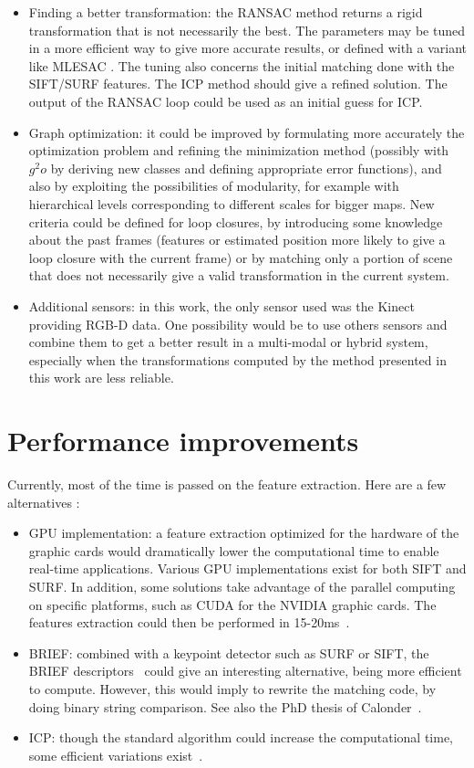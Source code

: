 \begin{itemize}
\item Finding a better transformation: the \gls{RANSAC} method returns a rigid transformation that is not necessarily the best. The parameters may be tuned in a more efficient way to give more accurate results, or defined with a variant like MLESAC \cite{TorrZ00}. The tuning also concerns the initial matching done with the \gls{SIFT}/\gls{SURF} features. The \gls{ICP} \cite{zhang_92_icp} method should give a refined solution. The output of the \gls{RANSAC} loop could be used as an initial guess for \gls{ICP}. 
\item Graph optimization: it could be improved by formulating more accurately the optimization problem and refining the minimization method (possibly with~$g^2o$ by deriving new classes and defining appropriate error functions), and also by exploiting the possibilities of modularity, for example with hierarchical levels corresponding to different scales for bigger maps. New criteria could be defined for loop closures, by introducing some knowledge about the past frames (features or estimated position more likely to give a loop closure with the current frame) or by matching only a portion of scene that does not necessarily give a valid transformation in the current system.
\item Additional sensors: in this work, the only sensor used was the Kinect providing RGB-D data. One possibility would be to use others sensors and combine them to get a better result in a multi-modal or hybrid system, especially when the transformations computed by the method presented in this work are less reliable.
\end{itemize}

\section{Performance improvements}

Currently, most of the time is passed on the feature extraction. Here are a few alternatives :
\begin{itemize}
\item GPU implementation: a feature extraction optimized for the hardware of the graphic cards would dramatically lower the computational time to enable real-time applications. Various GPU implementations exist for both SIFT and SURF. In addition, some solutions take advantage of the parallel computing on specific platforms, such as CUDA\texttrademark{} for the NVIDIA graphic cards. The features extraction could then be performed in 15-20ms~\cite{bjorkman}.
\item BRIEF: combined with a keypoint detector such as \gls{SURF} or \gls{SIFT}, the \gls{BRIEF} descriptors~\cite{Calonder10-brief} could give an interesting alternative, being more efficient to compute. However, this would imply to rewrite the matching code, by doing binary string comparison. See also the PhD thesis of Calonder~\cite{Calonder10_PhD}.
\item ICP: though the standard algorithm could increase the computational time, some efficient variations exist~\cite{Rusinkiewicz_2001}. 
\end{itemize}

